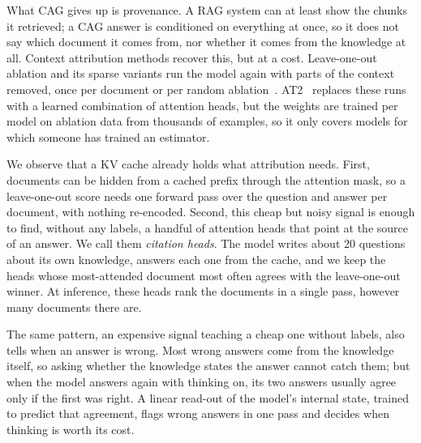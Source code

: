 \documentclass[11pt]{article}
\begin{document}
What CAG gives up is provenance. A RAG system can at least show the chunks it retrieved; a CAG answer is conditioned on everything at once, so it does not say which document it comes from, nor whether it comes from the knowledge at all. Context attribution methods recover this, but at a cost. Leave-one-out ablation and its sparse variants run the model again with parts of the context removed, once per document or per random ablation~\citep{cohenwang2024contextcite,liu2025attribot}. AT2~\citep{cohenwang2025at2} replaces these runs with a learned combination of attention heads, but the weights are trained per model on ablation data from thousands of examples, so it only covers models for which someone has trained an estimator.

We observe that a KV cache already holds what attribution needs. First, documents can be hidden from a cached prefix through the attention mask, so a leave-one-out score needs one forward pass over the question and answer per document, with nothing re-encoded. Second, this cheap but noisy signal is enough to find, without any labels, a handful of attention heads that point at the source of an answer. We call them \emph{citation heads}. The model writes about 20 questions about its own knowledge, answers each one from the cache, and we keep the heads whose most-attended document most often agrees with the leave-one-out winner. At inference, these heads rank the documents in a single pass, however many documents there are.

The same pattern, an expensive signal teaching a cheap one without labels, also tells when an answer is wrong. Most wrong answers come from the knowledge itself, so asking whether the knowledge states the answer cannot catch them; but when the model answers again with thinking on, its two answers usually agree only if the first was right. A linear read-out of the model's internal state, trained to predict that agreement, flags wrong answers in one pass and decides when thinking is worth its cost.
\end{document}
